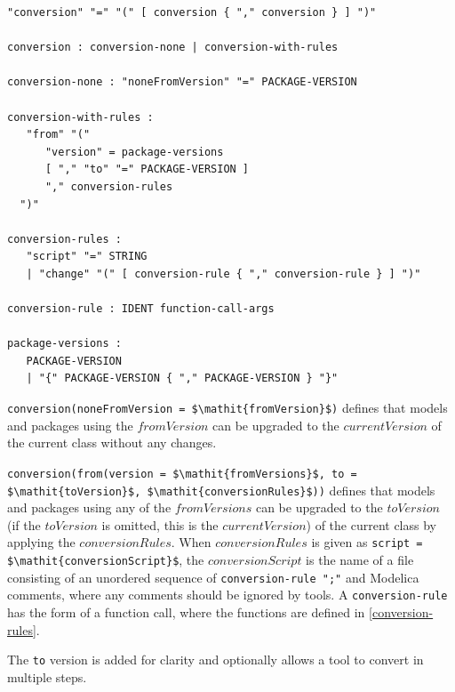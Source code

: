\begin{annotationdefinition}[conversion]
\begin{synopsis}[grammar]\begin{lstlisting}
"conversion" "=" "(" [ conversion { "," conversion } ] ")"

conversion : conversion-none | conversion-with-rules

conversion-none : "noneFromVersion" "=" PACKAGE-VERSION

conversion-with-rules :
   "from" "("
      "version" = package-versions
      [ "," "to" "=" PACKAGE-VERSION ]
      "," conversion-rules
  ")"

conversion-rules :
   "script" "=" STRING
   | "change" "(" [ conversion-rule { "," conversion-rule } ] ")"

conversion-rule : IDENT function-call-args

package-versions :
   PACKAGE-VERSION
   | "{" PACKAGE-VERSION { "," PACKAGE-VERSION } "}"
\end{lstlisting}\end{synopsis}
\begin{semantics}
\lstinline!conversion(noneFromVersion = $\mathit{fromVersion}$)! defines that models and packages using the $\mathit{fromVersion}$ can be upgraded to the $\mathit{currentVersion}$ of the current class without any changes.

\lstinline!conversion(from(version = $\mathit{fromVersions}$, to = $\mathit{toVersion}$, $\mathit{conversionRules}$))! defines that models and packages using any of the $\mathit{fromVersions}$ can be upgraded to the $\mathit{toVersion}$ (if the $\mathit{toVersion}$ is omitted, this is the $\mathit{currentVersion}$) of the current class by applying the $\mathit{conversionRules}$.
When $\mathit{conversionRules}$ is given as \lstinline!script = $\mathit{conversionScript}$!, the $\mathit{conversionScript}$ is the name of a file consisting of an unordered sequence of \lstinline[language=grammar]!conversion-rule ";"! and Modelica comments, where any comments should be ignored by tools.
A \lstinline[language=grammar]!conversion-rule! has the form of a function call, where the functions are defined in \cref{conversion-rules}.

\begin{nonnormative}
The \lstinline!to! version is added for clarity and optionally allows a tool to convert in multiple steps.
\end{nonnormative}
\end{semantics}
\end{annotationdefinition}

